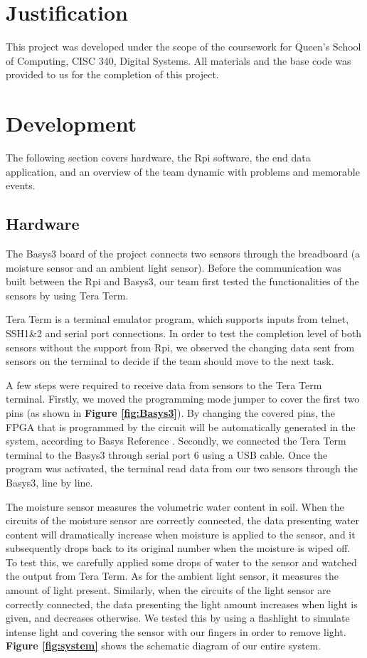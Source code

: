 \documentclass[a4paper]{article}
\begin{document}
\section{Justification}

This project was developed under the scope of the coursework for Queen's School of Computing, CISC 340, Digital Systems. All materials and the base code was provided to us for the completion of this project.

\section{Development}

The following section covers hardware, the Rpi software, the end data application, and an overview of the team dynamic with problems and memorable events.

\subsection{Hardware}

The Basys3 board of the project connects two sensors through the breadboard (a moisture sensor and an ambient light sensor).  Before the communication was built between the Rpi and Basys3, our team first tested the functionalities of the sensors by using Tera Term.

Tera Term is a terminal emulator program, which supports inputs from telnet, SSH1\&2 and  serial port connections. In order to test the completion level of both sensors without the support from Rpi, we observed the changing data sent from sensors on the terminal to decide if the team should move to the next task.

A few steps were required to receive data from sensors to the Tera Term terminal. Firstly, we moved the programming mode jumper to cover the first two pins (as shown in \textbf{Figure \ref{fig:Basys3}}). By changing the covered pins, the FPGA that is programmed by the circuit will be automatically generated in the system, according to Basys Reference \cite{basys}. Secondly, we connected the Tera Term terminal to the Basys3 through serial port 6 using a USB cable. Once the program was activated, the terminal read data from our two sensors through the Basys3, line by line.

The moisture sensor measures the volumetric water content in soil. When the circuits of the moisture sensor are correctly connected, the data presenting water content will dramatically increase when moisture is applied to the sensor, and it subsequently drops back to its original number when the moisture is wiped off. To test this, we carefully applied some drops of water to the sensor and watched the output from Tera Term. As for the ambient light sensor, it measures the amount of light present. Similarly, when the circuits of the light sensor are correctly connected, the data presenting the light amount increases when light is given, and decreases otherwise. We tested this by using a flashlight to simulate intense light and covering the sensor with our fingers in order to remove light.  \textbf{Figure \ref{fig:system}} shows the schematic diagram of our entire system.
\end{document}
